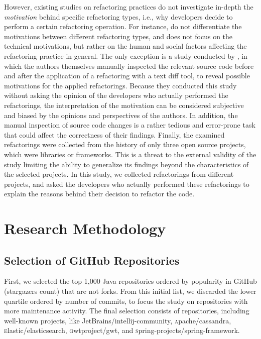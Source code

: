 However, existing studies on refactoring practices do not investigate in-depth the {\em motivation} behind specific refactoring types, i.e., why developers decide to perform a certain refactoring operation.
For instance, \cite{kim-tse-2014} do not differentiate the motivations between different refactoring types,
and \cite{Wang:2009} does not focus on the technical motivations, but rather on the human and social factors affecting the refactoring practice in general.
The only exception is a study conducted by \cite{tsantalis_empiricalstudy},
in which the authors themselves manually inspected the relevant source code before and after the application of a refactoring with a text diff tool, to reveal possible motivations for the applied refactorings.
Because they conducted this study without asking the opinion of the developers who actually performed the refactorings,
the interpretation of the motivation can be considered subjective and biased by the opinions and perspectives of the authors.
In addition, the manual inspection of source code changes is a rather tedious and error-prone task that could affect the correctness of their findings.
Finally, the examined refactorings were collected from the history of only three open source projects, which were libraries or frameworks.
This is a threat to the external validity of the study limiting the ability to generalize its findings beyond the characteristics of the selected projects.
In this study, we collected refactorings from \studiedProjects different projects, and asked the developers who actually performed these refactorings to explain the reasons behind their decision to refactor the code.


\section{Research Methodology}
\label{SecMethodology}


\subsection{Selection of GitHub Repositories}

First, we selected the top 1,000 Java repositories ordered by popularity in GitHub (stargazers count) that are not forks. From this initial list, we discarded the lower quartile ordered by number of commits, to focus the study on repositories with more maintenance activity. The final selection consists of \totalProjects repositories, including well-known projects, like {\textsc JetBrains/intellij-community}, {\textsc apache/cassandra}, {\textsc e\-lastic/elasticsearch}, {\textsc gwtproject/gwt}, and {\textsc spring-projects/spring-framework}.


